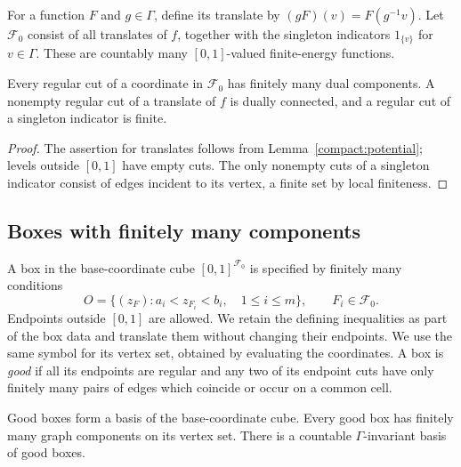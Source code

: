 For a function $F$ and $g\in\Gamma$, define its translate by
$(gF)(v)=F(g^{-1}v)$.  Let $\mathcal F_0$ consist of all translates of
$f$, together with the singleton indicators $1_{\{v\}}$ for
$v\in\Gamma$.  These are countably many $[0,1]$-valued finite-energy
functions.

\begin{lemma}\label{compact:wall-components}
Every regular cut of a coordinate in $\mathcal F_0$ has finitely many
dual components.  A nonempty regular cut of a translate of $f$ is
dually connected, and a regular cut of a singleton indicator is finite.
\end{lemma}

\begin{proof}
The assertion for translates follows from Lemma~\ref{compact:potential};
levels outside $[0,1]$ have empty cuts.  The only nonempty cuts of a
singleton indicator consist of edges incident to its vertex, a finite
set by local finiteness.
\end{proof}

\subsection{Boxes with finitely many components}

A box in the base-coordinate cube $[0,1]^{\mathcal F_0}$ is specified by
finitely many conditions
\[
 O=\{(z_F):a_i<z_{F_i}<b_i,\quad 1\le i\le m\},
 \qquad F_i\in\mathcal F_0.
\]
Endpoints outside $[0,1]$ are allowed.  We retain the defining
inequalities as part of the box data and translate them without
changing their endpoints.  We use the same symbol for its vertex set,
obtained by evaluating the coordinates.  A box is
\emph{good} if all its endpoints are regular and any two of its endpoint
cuts have only finitely many pairs of edges which coincide or occur on
a common cell.

\begin{lemma}\label{compact:good-boxes}
Good boxes form a basis of the base-coordinate cube.  Every good box
has finitely many graph components on its vertex set.  There is a
countable $\Gamma$-invariant basis of good boxes.
\end{lemma}

